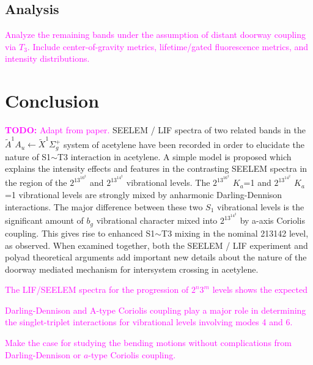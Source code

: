 \documentclass[12pt,draft]{mitthesis}
\newcommand{\TODO} [1]{\textcolor{magenta}{\textbf{TODO:} #1}}
\newcommand{\POINT}[1]{\textcolor{magenta}{#1}}
\begin{document}
\subsection{Analysis}

\POINT{Analyze the remaining bands under the assumption of distant
  doorway coupling via $T_3$.  Include center-of-gravity metrics,
  lifetime/gated fluorescence metrics, and intensity distributions.}

\section{Conclusion}

\TODO{Adapt from paper.}  SEELEM / LIF spectra of two related bands in
the $\tilde{A}^1A_u \leftarrow \tilde{X} ^1\Sigma_g^+$ system of
acetylene have been recorded in order to elucidate the nature of
S1$\sim$T3 interaction in acetylene. A simple model is proposed which
explains the intensity effects and features in the contrasting SEELEM
spectra in the region of the $2^13^16^2$ and $2^13^14^2$ vibrational
levels. The $2^13^16^2$ $K_a$=1 and $2^13^14^2$ $K_a$=1 vibrational
levels are strongly mixed by anharmonic Darling-Dennison
interactions. The major difference between these two $S_1$ vibrational
levels is the significant amount of $b_g$ vibrational character mixed
into $2^13^14^2$ by a-axis Coriolis coupling. This gives rise to
enhanced S1$\sim$T3 mixing in the nominal 213142 level, as observed.
When examined together, both the SEELEM / LIF experiment and polyad
theoretical arguments add important new details about the nature of
the doorway mediated mechanism for intersystem crossing in acetylene.

\POINT{The LIF/SEELEM spectra for the progression of $2^n3^m$ levels
  shows the expected}

\POINT{Darling-Dennison and A-type Coriolis coupling play a major role
  in determining the singlet-triplet interactions for vibrational
  levels involving modes 4 and 6.}

\POINT{Make the case for studying the bending motions without
  complications from Darling-Dennison or $a$-type Coriolis coupling.}



\end{document}
